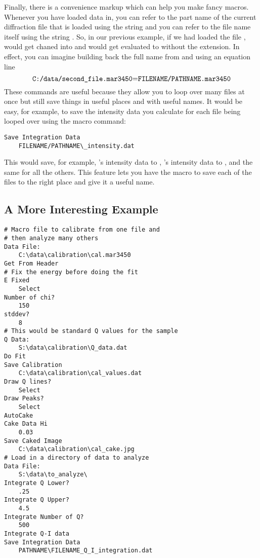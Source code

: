 Finally, there is a convenience markup which can help you make fancy macros. Whenever you have loaded data in, you can refer to the part name of the current diffraction file that is loaded using the string  and you can refer to the file name itself using the string . So, in our previous example, if we had loaded the file ,  would get chaned into  and  would get evaluated to  without the extension. In effect, you can imagine building back the full name from  and  using an equation line
\begin{equation*}
\text{{\ttfamily C:/data/second\_file.mar3450}={\ttfamily FILENAME/PATHNAME.mar3450}}
\end{equation*}
These commands are useful because they allow you to loop over many files at once but still save things in useful places and with useful names. It would be easy, for example, to save the intensity data you calculate for each file being looped over using the macro command:
\begin{lstlisting}[caption={'Using the FILENAME and PATHNAME Markup'}]
Save Integration Data
    FILENAME/PATHNAME\_intensity.dat
\end{lstlisting}
This would save, for example, 's intensity data to , 's intensity data to , and the same for all the others. This feature lets you have the macro to save each of the files to the right place and give it a useful name.

\subsection{A More Interesting Example}

\begin{lstlisting}[caption={'A Non-Trivial Macro'}]
# Macro file to calibrate from one file and 
# then analyze many others
Data File:
    C:\data\calibration\cal.mar3450
Get From Header
# Fix the energy before doing the fit
E Fixed
    Select
Number of chi?
    150
stddev?
    8
# This would be standard Q values for the sample
Q Data:
    S:\data\calibration\Q_data.dat
Do Fit
Save Calibration
    C:\data\calibration\cal_values.dat
Draw Q lines?
    Select
Draw Peaks?
    Select
AutoCake
Cake Data Hi
    0.03
Save Caked Image
    C:\data\calibration\cal_cake.jpg
# Load in a directory of data to analyze
Data File:
    S:\data\to_analyze\
Integrate Q Lower?
    .25
Integrate Q Upper?
    4.5
Integrate Number of Q?
    500
Integrate Q-I data
Save Integration Data
    PATHNAME\FILENAME_Q_I_integration.dat
\end{lstlisting}

